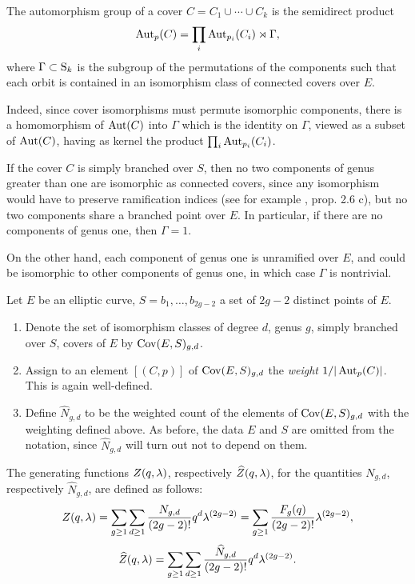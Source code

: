 \begin{rmk}
 The automorphism group of a cover $C=C_1 \cup \dotsb \cup C_k$ is the semidirect product \[\operatorname{Aut}_p(C) = \prod_i \operatorname{Aut}_{p_i}(C_i) \rtimes \Gamma,\] where $\Gamma \subset \operatorname{S}_k$ is the subgroup of the permutations of the components such that each orbit is contained in an isomorphism class of connected covers over $E$.
 
 Indeed, since cover isomorphisms must permute isomorphic components, there is a homomorphism of $\operatorname{Aut}(C)$ into $\Gamma$ which is the identity on $\Gamma$, viewed as a subset of $\operatorname{Aut}(C)$, having as kernel the product $\prod_i \operatorname{Aut}_{p_i}(C_i)$.
 
 If the cover $C$ is simply branched over $S$, then no two components of genus greater than one are isomorphic as connected covers, since any isomorphism would have to preserve ramification indices (see for example \cite{Silverman2009}, prop. 2.6 c), but no two components share a branched point over $E$. In particular, if there are no components of genus one, then $\Gamma=1$.
 
 On the other hand, each component of genus one is unramified over $E$, and could be isomorphic to other components of genus one, in which case $\Gamma$ is nontrivial.
\end{rmk}

\begin{defi} Let $E$ be an elliptic curve, $S={b_1,\dotsc,b_{2g-2}}$ a set of $2g-2$ distinct points of $E$.
 \begin{enumerate}
  \item Denote the set of isomorphism classes of degree $d$, genus $g$, simply branched over $S$, covers of $E$ by $\operatorname{Cov}(E,S)_{g,d}$.
 
  \item Assign to an element $[(C,p)]$ of $\operatorname{Cov}(E,S)_{g,d}$ the \emph{weight} $1/|\operatorname{Aut}_p(C)|$. This is again well-defined.
 
  \item Define $\widehat{N}_{g,d}$ to be the weighted count of the elements of $\operatorname{Cov}(E,S)_{g,d}$ with the weighting defined above. As before, the data $E$ and $S$ are omitted from the notation, since $\widehat{N}_{g,d}$ will turn out not to depend on them. 
 \end{enumerate}
\end{defi}

\begin{defi}
 The generating functions $Z(q,\lambda)$, respectively $\widehat{Z}(q,\lambda)$, for the quantities $N_{g,d}$, respectively $\widehat{N}_{g,d}$, are defined as follows:
 \[Z(q,\lambda) = \sum_{g\geq 1}\sum_{d\geq 1} \frac{N_{g,d}}{(2g-2)!}q^d\lambda^{(2g-2)} 
 = \sum_{g\geq 1}\frac{F_g(q)}{(2g-2)!}\lambda^{(2g-2)},\]
 \[\widehat{Z}(q,\lambda) = \sum_{g\geq 1}\sum_{d\geq 1} \frac{\widehat{N}_{g,d}}{(2g-2)!}q^d\lambda^{(2g-2)}.\]
\end{defi}

